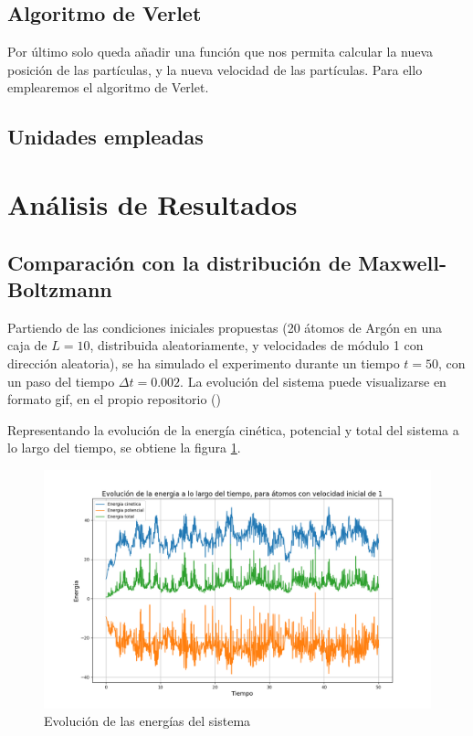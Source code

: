 \documentclass[11pt, twoside]{article} %
\begin{document}
\subsection{Algoritmo de Verlet}

Por último solo queda añadir una función que nos permita calcular la nueva posición
de las partículas, y la nueva velocidad de las partículas. Para ello emplearemos el
algoritmo de Verlet. 

\subsection{Unidades empleadas}

\newpage

\section{Análisis de Resultados}

\subsection{Comparación con la distribución de Maxwell-Boltzmann}

Partiendo de las condiciones iniciales propuestas (20 átomos de Argón en una caja 
de $L=10$, distribuida aleatoriamente, y velocidades de módulo 1 con dirección aleatoria), se ha simulado el
experimento durante un tiempo $t = 50$, con un paso del tiempo 
$\Delta t = 0.002$. La evolución del sistema puede visualizarse en formato gif, 
en el propio repositorio ()

Representando la evolución de la energía cinética, potencial y total del sistema
a lo largo del tiempo, se obtiene la figura \ref{fig:energias}.

\begin{figure}[h!]
    \centering
    \includegraphics[width=\textwidth]{plots/energia_vel_init_1.png}
    \caption{Evolución de las energías del sistema}
    \label{fig:energias}
\end{figure}
\end{document}
